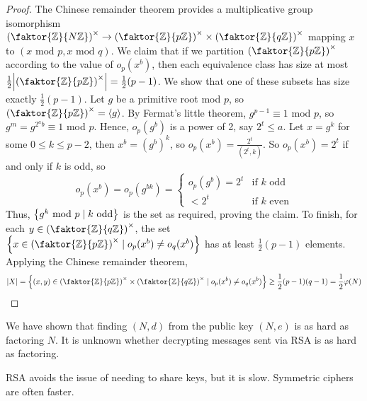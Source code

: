 \begin{proof}
    The Chinese remainder theorem provides a multiplicative group isomorphism \( \qty(\faktor{\mathbb Z}{N\mathbb Z})^\times \to \qty(\faktor{\mathbb Z}{p\mathbb Z})^\times \times \qty(\faktor{\mathbb Z}{q\mathbb Z})^\times \) mapping \( x \) to \( (x \text{ mod } p, x \text{ mod } q) \).
    We claim that if we partition \( \qty(\faktor{\mathbb Z}{p\mathbb Z})^\times \) according to the value of \( o_p(x^b) \), then each equivalence class has size at most \( \frac{1}{2} \abs{\qty(\faktor{\mathbb Z}{p\mathbb Z})^\times} = \frac{1}{2}(p-1) \).
    We show that one of these subsets has size exactly \( \frac{1}{2}(p-1) \).
    Let \( g \) be a primitive root mod \( p \), so \( \qty(\faktor{\mathbb Z}{p\mathbb Z})^\times = \genset{g} \).
    By Fermat's little theorem, \( g^{p-1} \equiv 1 \) mod \( p \), so \( g^m = g^{2^a b} \equiv 1 \) mod \( p \).
    Hence, \( o_p(g^b) \) is a power of 2, say \( 2^t \leq a \).
    Let \( x = g^k \) for some \( 0 \leq k \leq p - 2 \), then \( x^b = (g^b)^k \), so \( o_p(x^b) = \frac{2^t}{(2^t, k)} \).
    So \( o_p(x^b) = 2^t \) if and only if \( k \) is odd, so
    \[ o_p(x^b) = o_p(g^{bk}) = \begin{cases}
        o_p(g^b) = 2^t & \text{if } k \text{ odd} \\
        < 2^t & \text{if } k \text{ even}
    \end{cases} \]
    Thus, \( \qty{g^k \text{ mod } p \mid k \text{ odd}} \) is the set as required, proving the claim.
    To finish, for each \( y \in \qty(\faktor{\mathbb Z}{q\mathbb Z})^\times \), the set \( \qty{x \in \qty(\faktor{\mathbb Z}{p\mathbb Z})^\times \mid o_p(x^b) \neq o_q(x^b)} \) has at least \( \frac{1}{2}(p-1) \) elements.
    Applying the Chinese remainder theorem,
    \[ \abs{X} = \qty{(x,y) \in \qty(\faktor{\mathbb Z}{p\mathbb Z})^\times \times \qty(\faktor{\mathbb Z}{q\mathbb Z})^\times \mid o_p(x^b) \neq o_q(x^b)} \geq \frac{1}{2}(p-1)(q-1) = \frac{1}{2}\varphi(N) \]
\end{proof}
\begin{remark}
    We have shown that finding \( (N, d) \) from the public key \( (N, e) \) is as hard as factoring \( N \).
    It is unknown whether decrypting messages sent via RSA is as hard as factoring.

    RSA avoids the issue of needing to share keys, but it is slow.
    Symmetric ciphers are often faster.
\end{remark}
